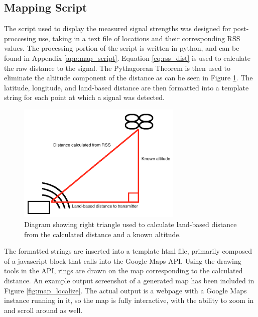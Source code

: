\subsection{Mapping Script}
The script used to display the measured signal strengths was designed for post-proccesing use, taking in a text file of locations and their corresponding RSS values. The processing portion of the script is written in python, and can be found in Appendix \ref{app:map_script}. Equation \ref{eq:rss_dist} is used to calculate the raw distance to the signal. The Pythagorean Theorem is then used to eliminate the altitude component of the distance as can be seen in Figure \ref{fig:dist_pyth}. %
The latitude, longitude, and land-based distance are then formatted into a template string for each point at which a signal was detected.\par
\begin{figure}[ht]
\centering
\includegraphics[width=0.70\textwidth]{img/distance_pythag_diagram.png}
\caption{Diagram showing right triangle used to calculate land-based distance from the calculated distance and a known altitude.}
\label{fig:dist_pyth}
\end{figure}
The formatted strings are inserted into a template html file, primarily composed of a javascript block that calls into the Google Maps API. Using the drawing tools in the API, rings are drawn on the map corresponding to the calculated distance. An example output screenshot of a generated map has been included in Figure \ref{fig:map_localize}. The actual output is a webpage with a Google Maps instance running in it, so the map is fully interactive, with the ability to zoom in and scroll around as well.
